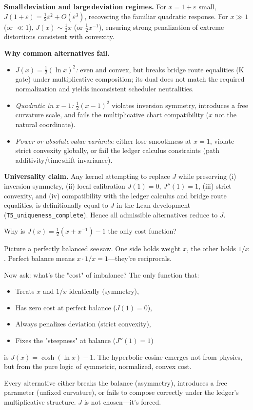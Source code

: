 \documentclass[11pt]{article}
\begin{document}
\textbf{Small\,deviation and large\,deviation regimes.} For $x=1+\varepsilon$ small, $J(1+\varepsilon)=\tfrac12\varepsilon^2+O(\varepsilon^3)$, recovering the familiar quadratic response. For $x\gg 1$ (or $\ll 1$), $J(x)\sim \tfrac12 x$ (or $\tfrac12 x^{-1}$), ensuring strong penalization of extreme distortions consistent with convexity.

\textbf{Why common alternatives fail.}
\begin{itemize}[leftmargin=*]
  \item \emph{$J(x)=\tfrac12(\ln x)^2$:} even and convex, but breaks bridge route equalities (K\,gate) under multiplicative composition; its dual does not match the required normalization and yields inconsistent scheduler neutralities.
  \item \emph{Quadratic in $x-1$:} $\tfrac12(x-1)^2$ violates inversion symmetry, introduces a free curvature scale, and fails the multiplicative chart compatibility ($x$ not the natural coordinate).
  \item \emph{Power or absolute\,value variants:} either lose smoothness at $x=1$, violate strict convexity globally, or fail the ledger calculus constraints (path additivity/time\,shift invariance).
\end{itemize}

\textbf{Universality claim.} Any kernel attempting to replace $J$ while preserving (i) inversion symmetry, (ii) local calibration $J(1)=0$, $J''(1)=1$, (iii) strict convexity, and (iv) compatibility with the ledger calculus and bridge route equalities, is definitionally equal to $J$ in the Lean development (\texttt{T5\_uniqueness\_complete}). Hence all admissible alternatives reduce to $J$.

\begin{intuitionbox}
Why is $J(x)=\frac{1}{2}(x+x^{-1})-1$ the only cost function?

Picture a perfectly balanced see\,saw. One side holds weight $x$, the other holds $1/x$. Perfect balance means $x \cdot 1/x = 1$—they're reciprocals.

Now ask: what's the "cost" of imbalance? The only function that:
\begin{itemize}
  \item Treats $x$ and $1/x$ identically (symmetry),
  \item Has zero cost at perfect balance ($J(1)=0$),
  \item Always penalizes deviation (strict convexity),
  \item Fixes the "steepness" at balance ($J''(1)=1$)
\end{itemize}
is $J(x)=\cosh(\ln x)-1$. The hyperbolic cosine emerges not from physics, but from the pure logic of symmetric, normalized, convex cost.

Every alternative either breaks the balance (asymmetry), introduces a free parameter (unfixed curvature), or fails to compose correctly under the ledger's multiplicative structure. $J$ is not chosen—it's forced.
\end{intuitionbox}
\end{document}
